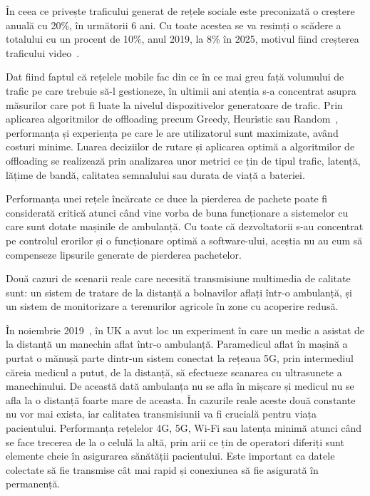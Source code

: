 \documentclass[12pt,a4paper]{report}
\begin{document}
În ceea ce privește traficului generat de rețele sociale este preconizată o creștere anuală cu 20\%, în următorii 6 ani. Cu toate acestea se va resimți o scădere a totalului cu un procent de 10\%, anul 2019, la 8\% în 2025, motivul fiind creșterea traficului video~\cite{ericsson_mobility_report}.

Dat fiind faptul că rețelele mobile fac din ce în ce mai greu față volumului de trafic pe care trebuie să-l gestioneze, în ultimii ani atenția s-a concentrat asupra măsurilor care pot fi luate la nivelul dispozitivelor generatoare de trafic. Prin aplicarea algoritmilor de offloading precum Greedy, Heuristic sau Random~\cite{offloading-jou}, performanța și experiența pe care le are utilizatorul sunt maximizate, având costuri minime. Luarea deciziilor de rutare și aplicarea optimă a algoritmilor de offloading se realizează prin analizarea unor metrici ce țin de tipul trafic, latență, lățime de bandă, calitatea semnalului sau durata de viață a bateriei.

Performanța unei rețele încărcate ce duce la pierderea de pachete poate fi considerată critică atunci când vine vorba de buna funcționare a sistemelor cu care sunt dotate mașinile de ambulanță. Cu toate că dezvoltatorii s-au concentrat pe controlul erorilor și o funcționare optimă a software-ului, aceștia nu au cum să compenseze lipsurile generate de pierderea pachetelor. 

Două cazuri de scenarii reale care necesită transmisiune multimedia de calitate sunt: un sistem de tratare de la distanță a bolnavilor aflați într-o ambulanță, și un sistem de monitorizare a terenurilor agricole în zone cu acoperire redusă.

În noiembrie 2019~\cite{use_case_ambulance}, în UK a avut loc un experiment în care un medic a asistat de la distanță un manechin aflat într-o ambulanță. Paramedicul aflat în mașină a purtat o mănușă parte dintr-un sistem conectat la rețeaua 5G, prin intermediul căreia medicul a putut, de la distanță, să efectueze scanarea cu ultrasunete a manechinului. De această dată ambulanța nu se afla în mișcare și medicul nu se afla la o distanță foarte mare de aceasta. În cazurile reale aceste două constante nu vor mai exista, iar calitatea transmisiunii va fi crucială pentru viața pacientului. Performanța rețelelor 4G, 5G, Wi-Fi sau latența minimă atunci când se face trecerea de la o celulă la altă, prin arii ce țin de operatori diferiți sunt elemente cheie în asigurarea sănătății pacientului. Este important ca datele colectate să fie transmise cât mai rapid și conexiunea să fie asigurată în permanență.
\end{document}
